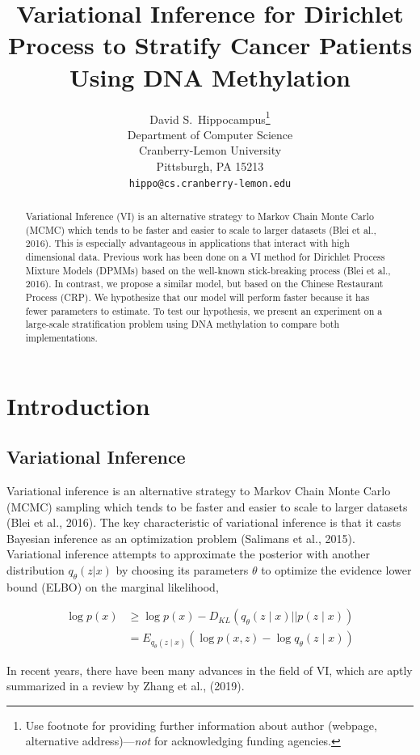 \documentclass{article}
\title{Variational Inference for Dirichlet Process to Stratify Cancer
Patients Using DNA Methylation}
\author{%
  David S.~Hippocampus\thanks{Use footnote for providing further information
    about author (webpage, alternative address)---\emph{not} for acknowledging
    funding agencies.} \\
  Department of Computer Science\\
  Cranberry-Lemon University\\
  Pittsburgh, PA 15213 \\
  \texttt{hippo@cs.cranberry-lemon.edu} \\
}
\begin{document}
\maketitle

\begin{abstract}
Variational Inference (VI) is an alternative strategy to Markov Chain Monte Carlo (MCMC) which tends to be faster and easier to scale to larger datasets (Blei et al., 2016). This is especially advantageous in applications that interact with high dimensional data. Previous work has been done on a VI method for Dirichlet Process Mixture Models (DPMMs) based on the well-known stick-breaking process (Blei et al., 2016). In contrast, we propose a similar model, but based on the Chinese Restaurant Process (CRP). We hypothesize that our model will perform faster because it has fewer parameters to estimate. To test our hypothesis, we present an experiment on a large-scale stratification problem using DNA methylation to compare both implementations.
\end{abstract}

\section{Introduction}

\subsection{Variational Inference}

Variational inference is an alternative strategy to Markov Chain Monte Carlo (MCMC) sampling which tends to be faster and easier to scale to larger datasets (Blei et al., 2016). The key characteristic of variational inference is that it casts Bayesian inference as an optimization problem (Salimans et al., 2015). Variational inference attempts to approximate the posterior with another distribution $q_\theta(z|x)$ by choosing its parameters $\theta$ to optimize the evidence lower bound (ELBO) on the marginal likelihood,

\begin{align*}
\log{p(x)} &\geq \log p(x) - D_{KL}(q_\theta(z\mid x)||p(z\mid x))\\
		   &= E_{q_\theta(z\mid x)}(\log p(x,z)-\log q_\theta (z\mid x))
\end{align*}

In recent years, there have been many advances in the field of VI, which are aptly summarized in a review by Zhang et al., (2019).
\end{document}
